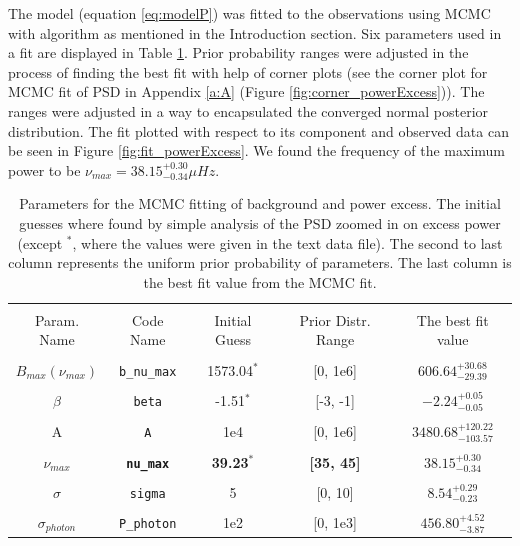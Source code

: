 \documentclass[12pt]{article}
\begin{document}
The model (equation \ref{eq:modelP}) was fitted to the observations using MCMC with algorithm as mentioned in the Introduction section. 
Six parameters used in a fit are displayed in Table \ref{tab:MCMC_param}. Prior probability ranges were adjusted in the process of finding the best fit with help of corner plots (see the corner plot for MCMC fit of PSD in Appendix \ref{a:A} (Figure \ref{fig:corner_powerExcess})). The ranges were adjusted in a way to encapsulated the converged normal posterior distribution. The fit plotted with respect to its component and observed data can be seen in Figure \ref{fig:fit_powerExcess}. We found the frequency of the maximum power to be $\nu_{max} = 38.15_{-0.34}^{+0.30} \mu Hz$.

\begin{table}[H]
  \centering
  \begin{tabular}{|c|c|c|c|c|}
    \hline 
    & & & &\\[-0.5em]
    Param. Name & Code Name & Initial Guess & Prior Distr. Range & The best fit value \\[5pt] \hline
    & & & &\\[-0.5em]
    $B_{max}(\nu_{max})$ & \texttt{b\_nu\_max} & 1573.04$^*$ & [0, 1e6] & $606.64_{-29.39}^{+30.68}$ \\[5pt] \hline
    & & & &\\[-0.5em]
    $\beta$ & \texttt{beta} & -1.51$^*$ & [-3, -1] & $-2.24_{-0.05}^{+0.05}$\\[5pt] \hline
    & & & &\\[-0.5em] 
    A & \texttt{A} & 1e4 & [0, 1e6] & $3480.68_{-103.57}^{+120.22}$\\[5pt] \hline
    & & & &\\[-0.5em]
    \textbf{$\nu_{max}$} & \textbf{\texttt{nu\_max}} & \textbf{39.23$^*$} & \textbf{[35, 45]} & $38.15_{-0.34}^{+0.30}$\\[5pt] \hline 
    & & & &\\[-0.5em]
    $\sigma$ & \texttt{sigma} & 5 & [0, 10] & $8.54_{-0.23}^{+0.29}$\\[5pt]  \hline
    & & & &\\[-0.5em]
    $\sigma_{photon}$ & \texttt{P\_photon} & 1e2 & [0, 1e3] & $456.80_{-3.87}^{+4.52}$\\[5pt] \hline
  \end{tabular}
  \caption{Parameters for the MCMC fitting of background and power excess. The initial guesses where found by simple analysis of the PSD zoomed in on excess power (except $^*$, where the values were given in the text data file). The second to last column represents the uniform prior probability of parameters. The last column is the best fit value from the MCMC fit.}
  \label{tab:MCMC_param}
\end{table}
\end{document}
